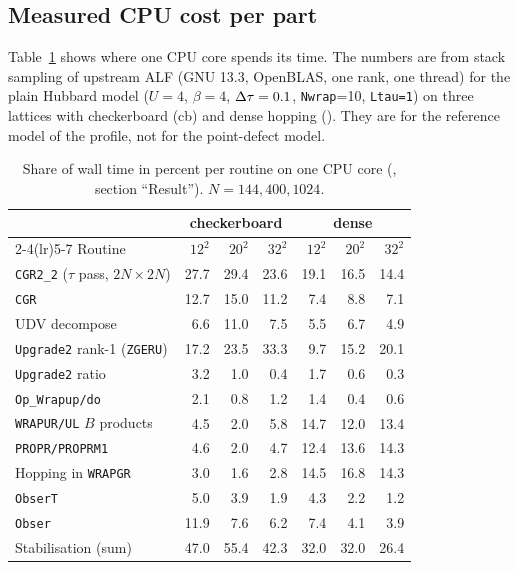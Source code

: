 \subsection{Measured CPU cost per part}

Table~\ref{tab:cpuprof} shows where one CPU core spends its time. The numbers are from stack sampling of upstream ALF (GNU 13.3, OpenBLAS, one rank, one thread) for the plain Hubbard model ($U=4$, $\beta=4$, $\Delta\tau=0.1$, \texttt{Nwrap}=10, \texttt{Ltau=1}) on three lattices with checkerboard (cb) and dense hopping (). They are for the reference model of the profile, not for the point-defect model.

\begin{table}[h]
\centering
\caption{Share of wall time in percent per routine on one CPU core (, section ``Result''). $N=144, 400, 1024$.}
\label{tab:cpuprof}
\small
\begin{tabular}{@{}lrrrrrr@{}}
\toprule
 & \multicolumn{3}{c}{checkerboard} & \multicolumn{3}{c}{dense} \\
\cmidrule(lr){2-4}\cmidrule(lr){5-7}
Routine & $12^2$ & $20^2$ & $32^2$ & $12^2$ & $20^2$ & $32^2$ \\
\midrule
\texttt{CGR2\_2} ($\tau$ pass, $2N\times2N$) & 27.7 & 29.4 & 23.6 & 19.1 & 16.5 & 14.4 \\ %
\texttt{CGR} & 12.7 & 15.0 & 11.2 & 7.4 & 8.8 & 7.1 \\ %
UDV decompose & 6.6 & 11.0 & 7.5 & 5.5 & 6.7 & 4.9 \\ %
\texttt{Upgrade2} rank-1 (\texttt{ZGERU}) & 17.2 & 23.5 & 33.3 & 9.7 & 15.2 & 20.1 \\ %
\texttt{Upgrade2} ratio & 3.2 & 1.0 & 0.4 & 1.7 & 0.6 & 0.3 \\ %
\texttt{Op\_Wrapup/do} & 2.1 & 0.8 & 1.2 & 1.4 & 0.4 & 0.6 \\ %
\texttt{WRAPUR/UL} $B$ products & 4.5 & 2.0 & 5.8 & 14.7 & 12.0 & 13.4 \\ %
\texttt{PROPR/PROPRM1} & 4.6 & 2.0 & 4.7 & 12.4 & 13.6 & 14.3 \\ %
Hopping in \texttt{WRAPGR} & 3.0 & 1.6 & 2.8 & 14.5 & 16.8 & 14.3 \\ %
\texttt{ObserT} & 5.0 & 3.9 & 1.9 & 4.3 & 2.2 & 1.2 \\ %
\texttt{Obser} & 11.9 & 7.6 & 6.2 & 7.4 & 4.1 & 3.9 \\ %
\midrule
Stabilisation (sum) & 47.0 & 55.4 & 42.3 & 32.0 & 32.0 & 26.4 \\ %

\end{tabular}
\end{table}
